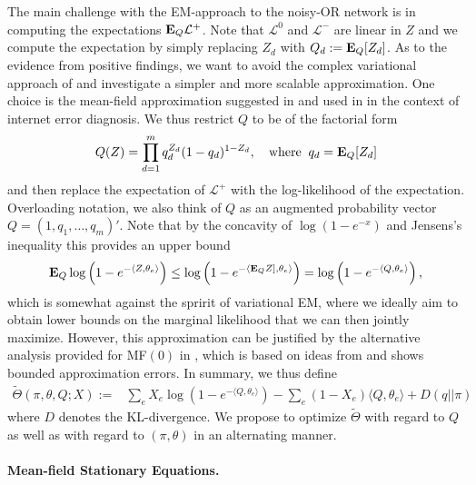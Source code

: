 \documentclass{article}
\newcommand{\E}{{\bf E}}
\newcommand{\loglike}{{\mathcal L}}
\begin{document}
The main challenge with the EM-approach to the noisy-OR network is in computing the expectations $\E_Q \loglike^+$. Note that $\loglike^0$ and $\loglike^-$ are linear in $Z$ and we compute the expectation by simply replacing $Z_d$ with $Q_d := \E_Q[Z_d]$.  As to the evidence from positive findings, we want to avoid the complex variational approach of \cite{jaakkola1999variational} and investigate a simpler and more scalable approximation. One choice is the mean-field approximation suggested in \cite{ng1999approximate} and used in \cite{platt2007fast} in the context of internet error diagnosis. We thus restrict $Q$ to be of the factorial form 
\begin{align}
Q(Z) = \prod_{d=1}^m q_d^{Z_d} (1-q_d)^{1-Z_d}, \quad \text{where} \;\; q_d = \E_Q[Z_d]
\end{align}
and then replace the expectation of $\loglike^+$ with the log-likelihood of the expectation. Overloading notation, we also think of $Q$ as an augmented probability vector $Q=(1,q_{1},\dots,q_{m})'$. Note that by the concavity of $\log (1-e^{-x})$ and Jensens's inequality this provides an upper  bound 
\begin{align}
\E_Q \log \left( 1- e ^{- \langle Z, \theta_e \rangle} \right) \le \log \left(1- e^{- \langle \E_Q Z], \theta_{e}\rangle} \right)  = \log \left(1- e^{-\langle Q, \theta_e\rangle} \right),
\end{align}
which is  somewhat against the spririt of variational EM, where we ideally aim to obtain lower bounds on the marginal likelihood that we can then jointly maximize. However, this approximation can be justified by the alternative analysis provided for MF$(0)$ in \cite{ng1999approximate}, which is based on ideas from \cite{kearns1998large} and shows bounded approximation errors. 
%
In summary, we thus define
\begin{align}
\tilde\Theta(\pi, \theta, Q; X) :=  & 
\sum_{e} X_e \log \left(1- e^{- \langle Q, \theta_{e} \rangle} \right)  
- \! \sum_{e} (1-X_e) \langle Q,\theta_e \rangle
+ D(q||\pi)
\end{align}
where $D$ denotes the KL-divergence. We propose to optimize $\tilde \Theta$ with regard to $Q$ as well as with regard to $(\pi,\theta)$ in an alternating manner. 


\paragraph{Mean-field Stationary Equations.}
\end{document}
